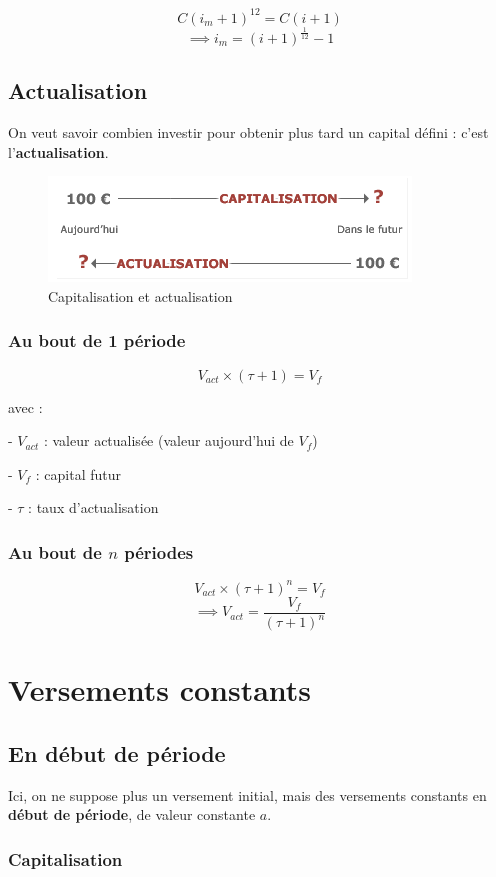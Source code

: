 \documentclass{article}
\begin{document}
$$C(i_m+1)^{12} = C(i+1)$$ $$\implies \boxed{i_m = (i+1)^{\frac{1}{12}} - 1}$$


\subsection{Actualisation}
On veut savoir combien investir pour obtenir plus tard un capital défini : c'est l'\textbf{actualisation}.


\begin{figure}[h]
    \centering
    \includegraphics{capi-vs-actu.png}
    \\Capitalisation et actualisation
\end{figure}

\subsubsection{Au bout de 1 période}
$$V_{act} \times(\tau+1)= V_f$$

avec :

- $V_{act}$ : valeur actualisée (valeur aujourd'hui de $V_f$)

- $V_f$ : capital futur

- $\tau$ : taux d'actualisation

\subsubsection{Au bout de $n$ périodes}
$$V_{act} \times(\tau+1)^n= V_f$$
$$\implies \boxed{V_{act} = \dfrac{V_f}{(\tau+1)^n}}$$


\section{Versements constants}

\subsection{En début de période}
Ici, on ne suppose plus un versement initial, mais des versements constants en \textbf{début de période}, de valeur constante $a$.
\subsubsection{Capitalisation}
\end{document}
